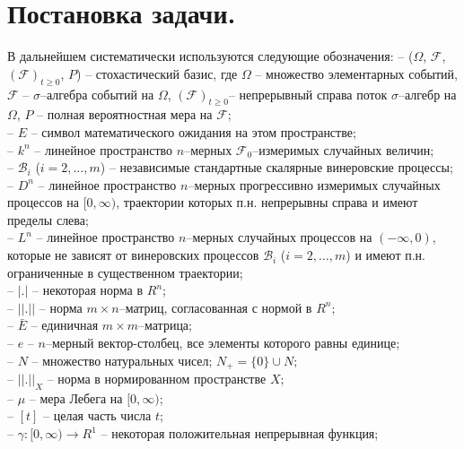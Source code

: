 
\section{Постановка задачи.}\label{kri-s1}
В дальнейшем систематически
используются следующие обозначения:
-- ($\Omega$, ${\mathcal F}$, $({\mathcal F})_{t\ge0}$, $P$)
-- стохастический базис, где $ \Omega $ -- множество элементарных
событий, ${\mathcal F}$ -- $\sigma$--алгебра событий на $\Omega$,
$({\mathcal F})_{t\ge0}$-- непрерывный справа поток $\sigma$--алгебр
на $\Omega$, $P$ -- полная вероятностная мера на $\mathcal{F}$;
\\ -- $E$ --
символ математического ожидания на этом пространстве;\\
-- $k^n$ -- линейное пространство  $n$--мерных
${\mathcal F}_0$--измеримых случайных величин;\\
  --  $\mathcal B_i$ ($i=2,\dots,m$)
-- независимые стандартные скалярные винеровские процессы;\\
-- $D^n$ -- линейное пространство $n$--мерных прогрессивно измеримых
случайных процессов на $[0, \infty )$, траектории которых п.н.
непрерывны справа и имеют пределы слева;\\
-- $L^n$ -- линейное пространство $n$--мерных случайных
процессов на $(-\infty , 0)$, которые не зависят от винеровских процессов
$\mathcal B_i$ ($i=2,\dots,m$) и имеют п.н. ограниченные в
существенном траектории;\\
-- $|.|$ -- некоторая норма в $R^n$;\\
 -- $||.||$ -- норма $m\times n$--матриц, согласованная с нормой в
$R^n$;\\
 -- $\bar E$ -- единичная $m \times m$--матрица;\\
 -- $e$ --
$n$--мерный вектор-столбец, все элементы которого равны единице;\\
  -- $N$ --
множество натуральных чисел; $N_+ = \{0\}\cup N$;\\
-- $||.||_X$ -- норма в нормированном
пространстве $X$;\\
-- $\mu $ -- мера Лебега на $[0, \infty)$;\\
-- $[t]$
-- целая часть числа $t$; \\
--  $\gamma :[0, \infty) \rightarrow R^1 $ -- некоторая
положительная непрерывная функция;\\
